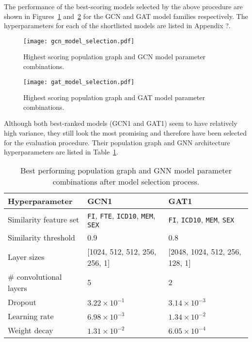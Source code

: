 The performance of the best-scoring models selected by the above procedure are shown in Figures~\ref{figure:gcn-rank} and~\ref{figure:gat-rank} for the GCN and GAT model families respectively. The hyperparameters for each of the shortlisted models are listed in Appendix ?.

\begin{figure}[]
    \centering
    \texttt{[image: gcn\_model\_selection.pdf]}
    \caption{Highest scoring population graph and GCN model parameter combinations.}\label{figure:gcn-rank}
\end{figure}

\begin{figure}[]
    \centering
    \texttt{[image: gat\_model\_selection.pdf]}
    \caption{Highest scoring population graph and GAT model parameter combinations.}\label{figure:gat-rank}
\end{figure}

Although both best-ranked models (GCN1 and GAT1) seem to have relatively high variance, they still look the most promising and therefore have been selected for the evaluation procedure. Their population graph and GNN architecture hyperparameters are listed in Table~\ref{table:best-hyperparameters}.

\begin{table}[]
    \caption{Best performing population graph and GNN model parameter combinations after model selection process.}\label{table:best-hyperparameters}
    \centering
    \small
    \begin{tabular}{p{}p{}p{}}
        \hline
    \textbf{Hyperparameter} & \textbf{GCN1} & \textbf{GAT1} \\  \hline
        Similarity feature set & \texttt{FI}, \texttt{FTE}, \texttt{ICD10}, \texttt{MEM}, \texttt{SEX} & \texttt{FI}, \texttt{ICD10}, \texttt{MEM}, \texttt{SEX} \\
        Similarity threshold & 0.9 & 0.8 \\ \hline
        Layer sizes & [1024, 512, 512, 256, 256, 1] & [2048, 1024, 512, 256, 128, 1] \\
        \# convolutional layers & 5 & 2 \\
        Dropout & $3.22 \times 10^{-1}$ & $3.14 \times 10^{-3}$ \\
        Learning rate & $6.98 \times 10^{-3}$ & $1.34 \times 10^{-2}$ \\
        Weight decay & $1.31 \times 10^{-2}$ & $6.05 \times 10^{-4}$ \\ \hline
\end{tabular}
\end{table}




